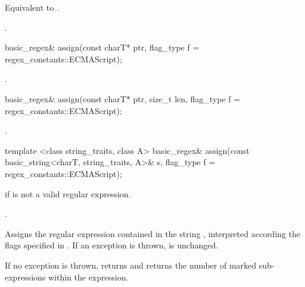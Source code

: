 \begin{itemdescr}
\pnum
\effects  Equivalent to .

\pnum
\returns  {}.
\end{itemdescr}

%
%
\begin{itemdecl}
basic_regex& assign(const charT* ptr, flag_type f = regex_constants::ECMAScript); 
\end{itemdecl}

\begin{itemdescr}
\pnum
\returns  {}.
\end{itemdescr}

%
%
\begin{itemdecl}
basic_regex& assign(const charT* ptr, size_t len,
  flag_type f = regex_constants::ECMAScript);
\end{itemdecl}

\begin{itemdescr}
\pnum
\returns {}.
\end{itemdescr}

%
%
\begin{itemdecl}
template <class string_traits, class A>
  basic_regex& assign(const basic_string<charT, string_traits, A>& s,
                      flag_type f = regex_constants::ECMAScript); 
\end{itemdecl}

\begin{itemdescr}
\pnum
\throws  {} if  is not a valid regular expression. 

\pnum
\returns  {}.

\pnum
\effects  Assigns the regular expression contained in the string
, interpreted according the flags specified in . 
If an exception is thrown,  is unchanged.  

\pnum
\postconditions
If no exception is thrown,
 returns  and 
returns the number of marked sub-expressions within the expression.
\end{itemdescr}

